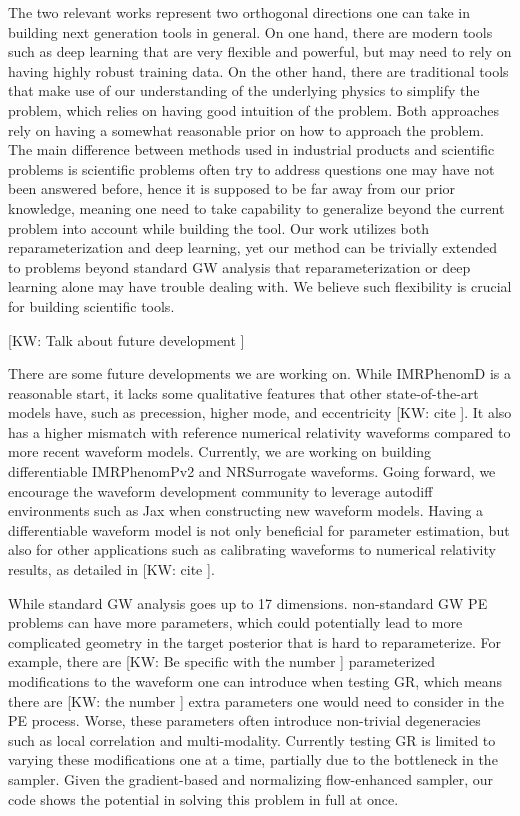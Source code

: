 \documentclass[twocolumn]{aastex631}
\newcommand{\kw}[1]{{\color{rb4}[KW: #1 ]}}
\begin{document}
The two relevant works represent two orthogonal directions one can take in
building next generation tools in general. On one hand, there are modern tools
such as deep learning that are very flexible and powerful, but may need to rely
on having highly robust training data. On the other hand, there are traditional
tools that make use of our understanding of the underlying physics to simplify
the problem, which relies on having good intuition of the problem. Both
approaches rely on having a somewhat reasonable prior on how to approach the
problem. The main difference between methods used in industrial products and
scientific problems is scientific problems often try to address questions one
may have not been answered before, hence it is supposed to be far away from our
prior knowledge, meaning one need to take capability to generalize beyond the
current problem into account while building the tool. Our work utilizes both
reparameterization and deep learning, yet our method can be trivially extended
to problems beyond standard GW analysis that reparameterization or deep learning
alone may have trouble dealing with. We believe such flexibility is crucial for
building scientific tools.


\kw{Talk about future development}

There are some future developments we are working on. While IMRPhenomD is
a reasonable start, it lacks some qualitative features that other
state-of-the-art models have, such as precession, higher mode, and eccentricity \kw{cite}. It
also has a higher mismatch with reference numerical relativity waveforms compared
to more recent waveform models. Currently, we are working on building differentiable
IMRPhenomPv2 and NRSurrogate waveforms. Going forward, we encourage the waveform
development community to leverage autodiff environments such as Jax when
constructing new waveform models. Having a differentiable waveform model is not
only beneficial for parameter estimation, but also for other applications such
as calibrating waveforms to numerical relativity results, as detailed in
\kw{cite}.

While standard GW analysis goes up to 17 dimensions. non-standard GW PE problems
can have more parameters, which could potentially lead to more complicated
geometry in the target posterior that is hard to reparameterize. For example,
there are \kw{Be specific with the number} parameterized modifications to the
waveform one can introduce when testing GR, which means there are \kw{the number}
extra parameters one would need to consider in the PE process. Worse, these
parameters often introduce non-trivial degeneracies such as local correlation
and multi-modality. Currently testing GR is limited to varying these
modifications one at a time, partially due to the bottleneck in the sampler. Given
the gradient-based and normalizing flow-enhanced sampler, our code shows
the potential in solving this problem in full at once.
\end{document}
